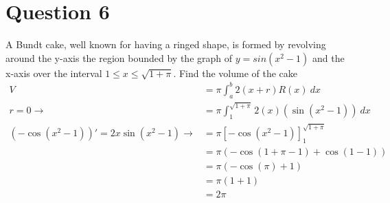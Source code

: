 \documentclass{article}
\begin{document}
\section*{Question 6}
A Bundt cake, well known for having a ringed shape, is formed by revolving around the y-axis the region bounded by the graph of $y = sin(x^2 -1)$ and the x-axis over the interval $1 \le x \le \sqrt{1+\pi}$. Find the volume of the cake
\begin{align*}
    V                                 & = \pi\int_{a}^{b}2(x+r)R(x)\:dx                   \\
    r=0 \to                           & = \pi\int_{1}^{\sqrt{1+\pi}}2(x)(\sin(x^2-1))\:dx \\
    (-\cos(x^2-1))'=2x\sin(x^2-1) \to & = \pi[-\cos(x^2-1)]_{1}^{\sqrt{1+\pi}}            \\
                                      & = \pi(-\cos(1+\pi-1)+\cos(1-1))                   \\
                                      & = \pi(-\cos(\pi)+1)                               \\
                                      & = \pi(1+1)                                        \\
                                      & = 2\pi
\end{align*}
\end{document}

